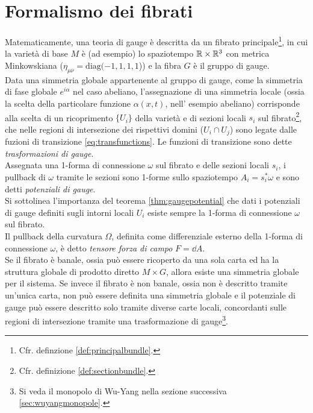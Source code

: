 
\section{Formalismo dei fibrati}
Matematicamente, una teoria di gauge è descritta da un fibrato principale\footnote{
   Cfr. definzione \ref{def:principalbundle}.
}, in cui
la varietà di base $M$ è (ad esempio) lo spaziotempo $\mathbb{R}\times\mathbb{R}^3$ con metrica
Minkowskiana ($ \eta _{\mu\nu} = \mathrm{diag}(-1,1,1,1$)) e la fibra $G$ è il
gruppo di gauge.\\
Data una simmetria globale appartenente al gruppo di gauge,
come la simmetria di fase globale $e^{i\alpha}$ nel caso abeliano,
l'assegnazione di una simmetria
locale (ossia la scelta della particolare funzione $\alpha(x,t)$, nell' esempio
 abeliano) corrisponde alla scelta di un ricoprimento $\{U_i\}$ della varietà
 e di sezioni locali $s_i$ sul fibrato\footnote{
   Cfr. definizione \ref{def:sectionbundle}.
 }, che nelle regioni di intersezione dei rispettivi domini ($U_i \cap U_j$)
 sono legate dalle fuzioni di transizione \ref{eq:transfunctions}.
Le funzioni di transizione sono dette \emph{trasformazioni di gauge}.\\

Assegnata una 1-forma di connessione $\omega$ sul fibrato e delle sezioni locali
$s_i$, i pullback di $\omega$ tramite le sezioni sono 1-forme sullo spaziotempo
$A_i = s_i^* \omega$ e sono detti \emph{potenziali di gauge}.\\
Si sottolinea l'importanza del teorema \ref{thm:gaugepotential} che dati i
potenziali di gauge definiti sugli intorni locali $U_i$ esiste sempre la 1-forma
di connessione $\omega$ sul fibrato.\\

Il pullback della curvatura $\Omega$, definita come differenziale esterno della
1-forma di connessione $\omega$, è detto \emph{tensore forza di campo} $F = \dd A$.\\

Se il fibrato è banale, ossia può essere ricoperto da una sola carta ed ha la
struttura globale di prodotto diretto $M \times G$, allora esiste una simmetria
globale per il sistema. Se invece il fibrato è non banale, ossia non è descritto
tramite un'unica carta, non può essere definita una simmetria globale e il potenziale
di gauge può essere descritto solo tramite diverse carte locali, concordanti sulle
regioni di intersezione tramite una trasformazione di gauge\footnote{
  Si veda il monopolo di Wu-Yang nella sezione successiva \ref{sec:wuyangmonopole}.
}.\\
